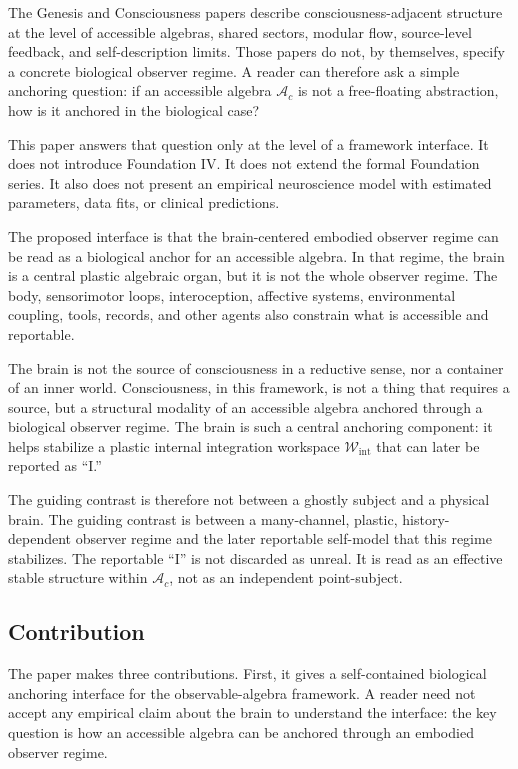 \documentclass[12pt]{article}
\theoremstyle{definition}
\theoremstyle{remark}
\newcommand{\Ac}{\mathcal A_c}
\newcommand{\Wint}{\mathcal W_{\mathrm{int}}}
\begin{document}
The Genesis and Consciousness papers describe consciousness-adjacent
structure at the level of accessible algebras, shared sectors, modular
flow, source-level feedback, and self-description limits. Those papers
do not, by themselves, specify a concrete biological observer regime. A
reader can therefore ask a simple anchoring question: if an accessible
algebra \(\Ac\) is not a free-floating abstraction, how is it anchored in
the biological case?

This paper answers that question only at the level of a framework
interface. It does not introduce Foundation IV. It does not extend the
formal Foundation series. It also does not present an empirical
neuroscience model with estimated parameters, data fits, or clinical
predictions.

The proposed interface is that the brain-centered embodied observer
regime can be read as a biological anchor for an accessible algebra. In
that regime, the brain is a central plastic algebraic organ, but it is
not the whole observer regime. The body, sensorimotor loops,
interoception, affective systems, environmental coupling, tools,
records, and other agents also constrain what is accessible and
reportable.

The brain is not the source of consciousness in a reductive sense, nor
a container of an inner world. Consciousness, in this framework, is not
a thing that requires a source, but a structural modality of an
accessible algebra anchored through a biological observer regime. The
brain is such a central anchoring component: it helps stabilize a
plastic internal integration workspace \(\Wint\) that can later be
reported as ``I.''

The guiding contrast is therefore not between a ghostly subject and a
physical brain. The guiding contrast is between a many-channel,
plastic, history-dependent observer regime and the later reportable
self-model that this regime stabilizes. The reportable ``I'' is not
discarded as unreal. It is read as an effective stable structure within
\(\Ac\), not as an independent point-subject.

\subsection*{Contribution}

The paper makes three contributions. First, it gives a self-contained
biological anchoring interface for the observable-algebra framework. A
reader need not accept any empirical claim about the brain to understand
the interface: the key question is how an accessible algebra can be
anchored through an embodied observer regime.
\end{document}
